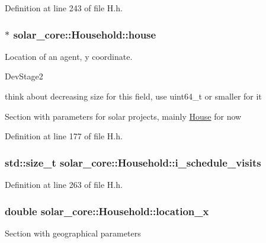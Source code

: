 Definition at line 243 of file H.\+h.

\hypertarget{classsolar__core_1_1_household_a1104d8264fe733937e1fd2e9ad0f8fc1}{}
\subsubsection[{house}]{$\ast$ solar\+\_\+core\+::\+Household\+::house}\label{classsolar__core_1_1_household_a1104d8264fe733937e1fd2e9ad0f8fc1}
Location of an agent, y coordinate.\begin{DoxyRefDesc}{Dev\+Stage2}
\item[\hyperlink{_dev_stage2__DevStage2000011}{Dev\+Stage2}]think about decreasing size for this field, use uint64\+\_\+t or smaller for it \end{DoxyRefDesc}


Section with parameters for solar projects, mainly \hyperlink{classsolar__core_1_1_house}{House} for now 

Definition at line 177 of file H.\+h.

\hypertarget{classsolar__core_1_1_household_a077c668f06c009a43c535f1ad92cf92e}{}
\subsubsection[{i\+\_\+schedule\+\_\+visits}]{\setlength{\rightskip}{0pt plus 5cm}std\+::size\+\_\+t solar\+\_\+core\+::\+Household\+::i\+\_\+schedule\+\_\+visits\hspace{0.3cm}{\ttfamily [protected]}}\label{classsolar__core_1_1_household_a077c668f06c009a43c535f1ad92cf92e}


Definition at line 263 of file H.\+h.

\hypertarget{classsolar__core_1_1_household_a6596375631a366fdd24270f75548841f}{}
\subsubsection[{location\+\_\+x}]{\setlength{\rightskip}{0pt plus 5cm}double solar\+\_\+core\+::\+Household\+::location\+\_\+x}\label{classsolar__core_1_1_household_a6596375631a366fdd24270f75548841f}
Section with geographical parameters 

